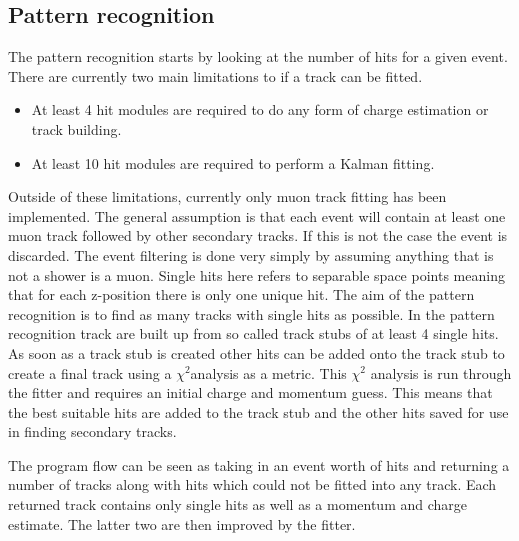 \subsection{Pattern recognition}
The pattern recognition starts by looking at the number of hits for a given event. There are currently two main limitations to if a track can be fitted.
\begin{itemize}
\item At least 4 hit modules are required to do any form of charge estimation or track building.
\item At least 10 hit modules are required to perform a Kalman fitting.
\end{itemize}
Outside of these limitations, currently only muon track fitting has been implemented. The general assumption is that each event will contain at least one muon track followed by other secondary tracks. If this is not the case the event is discarded. The event filtering is done very simply by assuming anything that is not a shower is a muon. Single hits here refers to separable space points meaning that for each z-position there is only one unique hit. The aim of the pattern recognition is to find as many tracks with single hits as possible. In the pattern recognition track are built up from so called track stubs of at least 4 single hits. As soon as a track stub is created other hits can be added onto the track stub to create a final track using a $\chi^2$analysis as a metric. This $\chi^2$ analysis is run through the fitter and requires an initial charge and momentum guess. This means that the best suitable hits are added to the track stub and the other hits saved for use in finding secondary tracks. 

The program flow can be seen as taking in an event worth of hits and returning a number of tracks along with hits which could not be fitted into any track. Each returned track contains only single hits as well as a momentum and charge estimate. The latter two are then improved by the fitter.


